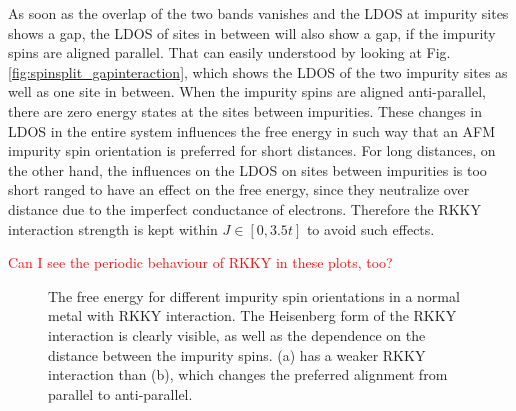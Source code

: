As soon as the overlap of the two bands vanishes and the LDOS at impurity sites shows a gap, the LDOS of sites in between will also show a gap, if the impurity spins are aligned parallel.
That can easily understood by looking at Fig. \ref{fig:spinsplit_gapinteraction}, which shows the LDOS of the two impurity sites as well as one site in between. 
When the impurity spins are aligned anti-parallel, there are zero energy states at the sites between impurities. \newline
These changes in LDOS in the entire system influences the free energy in such way that an AFM impurity spin orientation is preferred for short distances.
For long distances, on the other hand, the influences on the LDOS on sites between impurities is too short ranged to have an effect on the free energy, since they neutralize over distance due to the imperfect conductance of electrons. \newline 
Therefore the RKKY interaction strength is kept within $J\in [0, 3.5t]$ to avoid such effects.

\textcolor{red}{Can I see the periodic behaviour of RKKY in these plots, too?}

\begin{figure}[H]
    \centering
     \label{fig:spinstruct_nm_J2}
     \label{fig:spinstruct_nm_J5}
     \caption{The free energy for different impurity spin orientations in a normal metal with RKKY interaction. The Heisenberg form of the RKKY interaction is clearly visible, as well as the dependence on the distance between the impurity spins. (a) has a weaker RKKY interaction than (b), which changes the preferred alignment from parallel to anti-parallel.}
    \label{fig:spinstruct_nm}
\end{figure}

